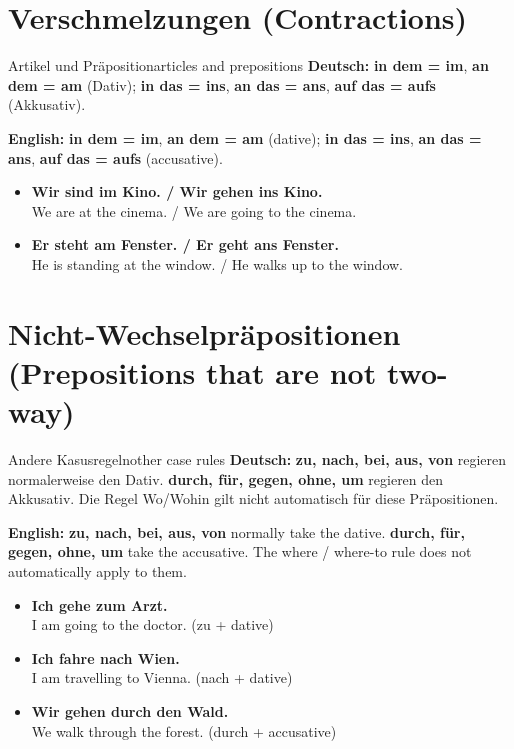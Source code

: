 \documentclass[a4paper,11pt]{article}
\newcommand{\GermanText}[1]{\textbf{Deutsch: }#1\par}
\newcommand{\EnglishText}[1]{{\small\color{SoftGray}\textbf{English: }#1\par}}
\newcommand{\ExampleItem}[2]{\item \textbf{#1}\\{\small\color{SoftGray}#2}}
\begin{document}
\section{Verschmelzungen (Contractions)}
\begin{grammarentry}{Artikel und Präposition}{articles and prepositions}
\GermanText{\textbf{in dem = im}, \textbf{an dem = am} (Dativ); \textbf{in das = ins}, \textbf{an das = ans}, \textbf{auf das = aufs} (Akkusativ).}
\EnglishText{\textbf{in dem = im}, \textbf{an dem = am} (dative); \textbf{in das = ins}, \textbf{an das = ans}, \textbf{auf das = aufs} (accusative).}
\end{grammarentry}
\begin{exbox}
\begin{itemize}
\ExampleItem{Wir sind im Kino. / Wir gehen ins Kino.}{We are at the cinema. / We are going to the cinema.}
\ExampleItem{Er steht am Fenster. / Er geht ans Fenster.}{He is standing at the window. / He walks up to the window.}
\end{itemize}
\end{exbox}
\section{Nicht-Wechselpräpositionen (Prepositions that are not two-way)}
\begin{grammarentry}{Andere Kasusregeln}{other case rules}
\GermanText{\textbf{zu, nach, bei, aus, von} regieren normalerweise den Dativ. \textbf{durch, für, gegen, ohne, um} regieren den Akkusativ. Die Regel Wo/Wohin gilt nicht automatisch für diese Präpositionen.}
\EnglishText{\textbf{zu, nach, bei, aus, von} normally take the dative. \textbf{durch, für, gegen, ohne, um} take the accusative. The where / where-to rule does not automatically apply to them.}
\end{grammarentry}
\begin{exbox}
\begin{itemize}
\ExampleItem{Ich gehe zum Arzt.}{I am going to the doctor. (zu + dative)}
\ExampleItem{Ich fahre nach Wien.}{I am travelling to Vienna. (nach + dative)}
\ExampleItem{Wir gehen durch den Wald.}{We walk through the forest. (durch + accusative)}
\end{itemize}
\end{exbox}
\end{document}

